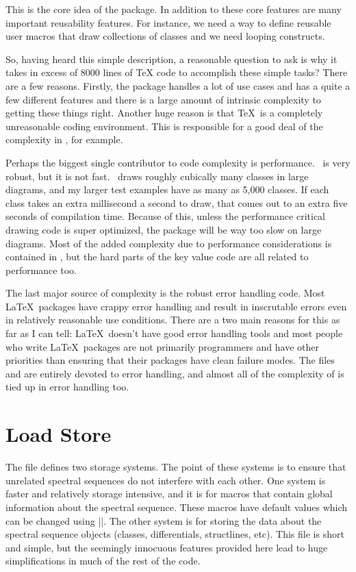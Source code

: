 This is the core idea of the package. In addition to these core features are many important reusability features. For instance, we need a way to define reusable user macros that draw collections of classes and we need looping constructs.

So, having heard this simple description, a reasonable question to ask is why it takes in excess of 8000 lines of TeX code to accomplish these simple tasks? There are a few reasons. Firstly, the package handles a lot of use cases and has a quite a few different features and there is a large amount of intrinsic complexity to getting these things right. Another huge reason is that \TeX\ is a completely unreasonable coding environment. This is responsible for a good deal of the complexity in , for example.

Perhaps the biggest single contributor to code complexity is performance. \tikzname\ is very robust, but it is not fast. \spectralsequences\ draws roughly cubically many classes in large diagrams, and my larger test examples have as many as 5,000 classes. If each class takes an extra millisecond a second to draw, that comes out to an extra five seconds of compilation time. Because of this, unless the performance critical drawing code is super optimized, the package will be way too slow on large diagrams. Most of the added complexity due to performance considerations is contained in , but the hard parts of the key value code are all related to performance too.

The last major source of complexity is the robust error handling code. Most \LaTeX\ packages have crappy error handling and result in inscrutable errors even in relatively reasonable use conditions. There are a two main reasons for this as far as I can tell: \LaTeX\ doesn't have good error handling tools and most people who write \LaTeX\ packages are not primarily programmers and have other priorities than ensuring that their packages have clean failure modes. The files  and  are entirely devoted to error handling, and almost all of the complexity of  is tied up in error handling too.



\section{Load Store}
The file  defines two storage systems. The point of these systems is to ensure that unrelated spectral sequences do not interfere with each other. One system is faster and relatively storage intensive, and it is for macros that contain global information about the spectral sequence. These macros have default values which can be changed using |\sseqset|. The other system is for storing the data about the spectral sequence objects (classes, differentials, structlines, etc). This file is short and simple, but the seemingly innocuous features provided here lead to huge simplifications in much of the rest of the code.

